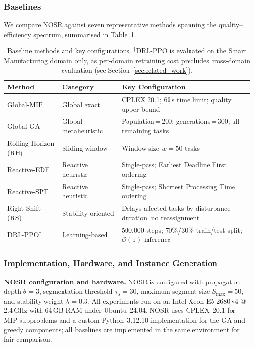 \documentclass[manuscript,screen,review]{acmart}
\begin{document}
\subsubsection{Baselines}
\label{sec:baselines}

We compare NOSR against seven representative methods spanning the
quality--efficiency spectrum, summarised in Table~\ref{tab:baselines}.

\begin{table}[t]
\centering
\caption{Baseline methods and key configurations.
$^\dagger$DRL-PPO is evaluated on the Smart Manufacturing domain only,
as per-domain retraining cost precludes cross-domain evaluation
(see Section~\ref{sec:related_work}).}
\label{tab:baselines}
\small
\begin{tabular}{@{}llp{5.5cm}@{}}
\toprule
\textbf{Method} & \textbf{Category} & \textbf{Key Configuration} \\
\midrule
Global-MIP   & Global exact        & CPLEX 20.1; 60\,s time limit; quality upper bound \\
Global-GA    & Global metaheuristic & Population\,=\,200; generations\,=\,300; all remaining tasks \\
Rolling-Horizon (RH) & Sliding window & Window size $w=50$ tasks \\
Reactive-EDF & Reactive heuristic  & Single-pass; Earliest Deadline First ordering \\
Reactive-SPT & Reactive heuristic  & Single-pass; Shortest Processing Time ordering \\
Right-Shift (RS) & Stability-oriented & Delays affected tasks by disturbance duration; no reassignment \\
DRL-PPO$^\dagger$ & Learning-based  & 500{,}000 steps; 70\%/30\% train/test split; $\mathcal{O}(1)$ inference \\
\bottomrule
\end{tabular}
\end{table}

\subsubsection{Implementation, Hardware, and Instance Generation}

\noindent\textbf{NOSR configuration and hardware.}
NOSR is configured with propagation depth $\theta=3$, segmentation
threshold $\tau_s=30$, maximum segment size $S_{\max}=50$, and stability
weight $\lambda=0.3$.
All experiments run on an Intel Xeon E5-2680\,v4 @ 2.4\,GHz with 64\,GB
RAM under Ubuntu~24.04.
NOSR uses CPLEX~20.1 for MIP subproblems and a custom Python~3.12.10
implementation for the GA and greedy components; all baselines are
implemented in the same environment for fair comparison.
\end{document}
